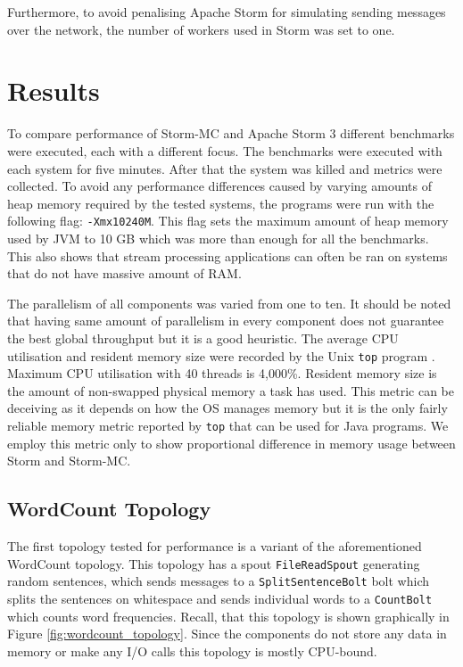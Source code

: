 Furthermore, to avoid penalising Apache Storm for simulating sending messages over the network, the number of workers used in Storm was set to one.

\section{Results}
\label{sec:performance}

To compare performance of Storm-MC and Apache Storm 3 different benchmarks were executed, each with a different focus. The benchmarks were executed with each system for five minutes. After that the system was killed and metrics were collected. To avoid any performance differences caused by varying amounts of heap memory required by the tested systems, the programs were run with the following flag: \texttt{-Xmx10240M}. This flag sets the maximum amount of heap memory used by JVM to 10 GB which was more than enough for all the benchmarks. This also shows that stream processing applications can often be ran on systems that do not have massive amount of RAM.

The parallelism of all components was varied from one to ten. It should be noted that having same amount of parallelism in every component does not guarantee the best global throughput but it is a good heuristic. The average CPU utilisation and resident memory size were recorded by the Unix \texttt{top} program \citep{UnixTop}. Maximum CPU utilisation with 40 threads is 4,000\%. Resident memory size is the amount of non-swapped physical memory a task has used. This metric can be deceiving as it depends on how the OS manages memory but it is the only fairly reliable memory metric reported by \texttt{top} that can be used for Java programs. We employ this metric only to show proportional difference in memory usage between Storm and Storm-MC.

\subsection{WordCount Topology}

The first topology tested for performance is a variant of the aforementioned WordCount topology. This topology has a spout \texttt{FileReadSpout} generating random sentences, which sends messages to a \texttt{SplitSentenceBolt} bolt which splits the sentences on whitespace and sends individual words to a \texttt{CountBolt} which counts word frequencies. Recall, that this topology is shown graphically in Figure \ref{fig:wordcount_topology}. Since the components do not store any data in memory or make any I/O calls this topology is mostly CPU-bound.

